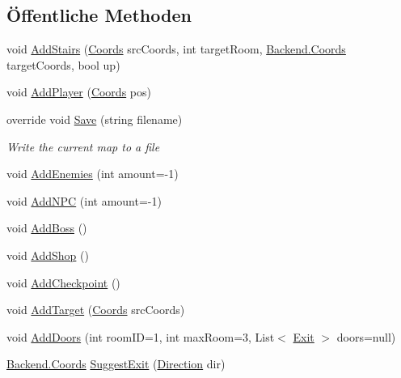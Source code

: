 \subsection*{Öffentliche Methoden}
\begin{DoxyCompactItemize}
\item 
void \hyperlink{class_gruppe22_1_1_backend_1_1_generator_ac8a9e00ddef47ce83f09a443bffed45a}{Add\-Stairs} (\hyperlink{class_gruppe22_1_1_backend_1_1_coords}{Coords} src\-Coords, int target\-Room, \hyperlink{class_gruppe22_1_1_backend_1_1_coords}{Backend.\-Coords} target\-Coords, bool up)
\item 
void \hyperlink{class_gruppe22_1_1_backend_1_1_generator_aea51f47ba3daf93d121cdd6b3f617d4f}{Add\-Player} (\hyperlink{class_gruppe22_1_1_backend_1_1_coords}{Coords} pos)
\item 
override void \hyperlink{class_gruppe22_1_1_backend_1_1_generator_ae0e94d668013ad78b8ed91f98009e488}{Save} (string filename)
\begin{DoxyCompactList}\small\item\em Write the current map to a file \end{DoxyCompactList}\item 
void \hyperlink{class_gruppe22_1_1_backend_1_1_generator_a538008c22b6442b950e50451ce575f91}{Add\-Enemies} (int amount=-\/1)
\item 
void \hyperlink{class_gruppe22_1_1_backend_1_1_generator_ae813499646756000d3288e683776d24d}{Add\-N\-P\-C} (int amount=-\/1)
\item 
void \hyperlink{class_gruppe22_1_1_backend_1_1_generator_a90af0ec184078329dae4f36205156f6a}{Add\-Boss} ()
\item 
void \hyperlink{class_gruppe22_1_1_backend_1_1_generator_a961803e6679ad31bc9305a35d4927a49}{Add\-Shop} ()
\item 
void \hyperlink{class_gruppe22_1_1_backend_1_1_generator_a3fc322786a2cc1680f500de2f664708c}{Add\-Checkpoint} ()
\item 
void \hyperlink{class_gruppe22_1_1_backend_1_1_generator_ad1c57acfaecff0f8810e57ff32c71685}{Add\-Target} (\hyperlink{class_gruppe22_1_1_backend_1_1_coords}{Coords} src\-Coords)
\item 
void \hyperlink{class_gruppe22_1_1_backend_1_1_generator_ab6dbb4455d4ab380f5951312ca52ee0b}{Add\-Doors} (int room\-I\-D=1, int max\-Room=3, List$<$ \hyperlink{class_gruppe22_1_1_backend_1_1_exit}{Exit} $>$ doors=null)
\item 
\hyperlink{class_gruppe22_1_1_backend_1_1_coords}{Backend.\-Coords} \hyperlink{class_gruppe22_1_1_backend_1_1_generator_a72c0d73906b5ca3fe948c47ce964b354}{Suggest\-Exit} (\hyperlink{namespace_gruppe22_1_1_backend_a2d53d5d14b8ea0951ba6971e5da1ebf5}{Direction} dir)

\end{DoxyCompactItemize}
